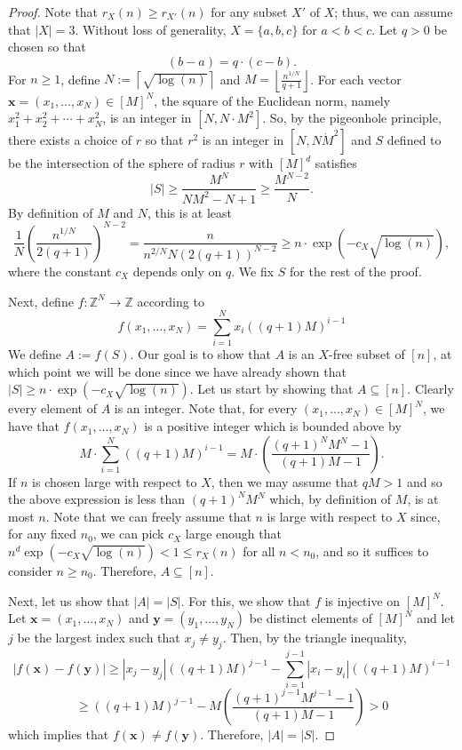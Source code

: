 \documentclass[12pt]{article}
\numberwithin{equation}{section}
\theoremstyle{definition}
\theoremstyle{remark}
\renewcommand{\vec}{\boldsymbol}
\begin{document}
\begin{proof}
Note that $r_X(n)\geq r_{X'}(n)$ for any subset $X'$ of $X$; thus, we can assume that $|X|=3$. Without loss of generality, $X=\{a,b,c\}$ for $a<b<c$. Let $q>0$ be chosen so that 
\[(b-a) = q\cdot(c-b).\]
For $n\geq1$, define $N:=\left\lceil \sqrt{\log(n)}\right\rceil$ and $M=\left\lfloor\frac{n^{1/N}}{q+1}\right\rfloor$. For each vector $\vec{x}=(x_1,\dots,x_N)\in [M]^N$, the square of the Euclidean norm, namely $x_1^2+x_2^2+\cdots +x_N^2$, is an integer in $[N,N\cdot M^2]$. So, by the pigeonhole principle, there exists a choice of $r$ so that $r^2$ is an integer in $[N,N\dot M^2]$ and $S$ defined to be the intersection of the sphere of radius $r$ with $[M]^d$ satisfies 
\[|S|\geq \frac{M^N}{NM^2-N+1}\geq \frac{M^{N-2}}{N}.\]
By definition of $M$ and $N$, this is at least
\[\frac{1}{N}\left(\frac{n^{1/N}}{2(q+1)}\right)^{N-2}=\frac{n}{n^{2/N}N(2(q+1))^{N-2}}\geq n\cdot \exp(-c_X\sqrt{\log(n)}),\]
where the constant $c_X$ depends only on $q$. We fix $S$ for the rest of the proof.

Next, define $f:\mathbb{Z}^N\to \mathbb{Z}$ according to
\[f(x_1,\dots,x_N)=\sum_{i=1}^Nx_i((q+1)M)^{i-1}\]
We define $A:=f(S)$. Our goal is to show that $A$ is an $X$-free subset of $[n]$, at which point we will be done since we have already shown that $|S|\geq n\cdot\exp(-c_X\sqrt{\log(n)})$. Let us start by showing that $A\subseteq [n]$. Clearly every element of $A$ is an integer. Note that, for every $(x_1,\dots,x_N)\in [M]^N$, we have that $f(x_1,\dots,x_N)$ is a positive integer which is bounded above by 
\[M\cdot\sum_{i=1}^N((q+1)M)^{i-1} = M\cdot\left(\frac{(q+1)^NM^N-1}{(q+1)M-1}\right).\]
If $n$ is chosen large with respect to $X$, then we may assume that $qM>1$ and so the above expression is less than $(q+1)^NM^N$ which, by definition of $M$, is at most $n$. Note that we can freely assume that $n$ is large with respect to $X$ since, for any fixed $n_0$, we can pick $c_X$ large enough that $n^d\exp(-c_X\sqrt{\log(n)})<1\leq r_X(n)$ for all $n<n_0$, and so it suffices to consider $n\geq n_0$. Therefore, $A\subseteq [n]$.

Next, let us show that $|A|=|S|$. For this, we show that $f$ is injective on $[M]^N$. Let $\vec{x}=(x_1,\dots,x_N)$ and $\vec{y}=(y_1,\dots,y_N)$ be distinct elements of $[M]^N$ and let $j$ be the largest index such that $x_j\neq y_j$. Then, by the triangle inequality, 
\[\left|f(\vec{x})-f(\vec{y})\right| \geq |x_j-y_j|((q+1)M)^{j-1} - \sum_{i=1}^{j-1}|x_i-y_i|((q+1)M)^{i-1}\]
\[\geq ((q+1)M)^{j-1} - M\left(\frac{(q+1)^{j-1}M^{j-1}-1}{(q+1)M-1}\right)>0\]
which implies that $f(\vec{x})\neq f(\vec{y})$. Therefore, $|A|=|S|$. 


\end{proof}
\end{document}
